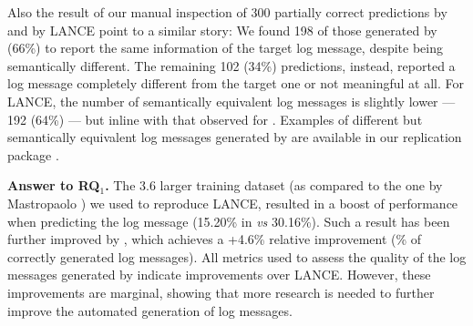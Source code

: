 Also the result of our manual inspection of 300 partially correct predictions by \approach and by LANCE point to a similar story: We found 198 of those generated by \approach (66\%) to report the same information of the target log message, despite being semantically different. The remaining 102 (34\%) predictions, instead, reported a log message completely different from the target one or not meaningful at all. For LANCE, the number of semantically equivalent log messages is slightly lower --- 192 (64\%) --- but inline with that observed for \approach. Examples of different but semantically equivalent log messages generated by \approach are available in our replication package \cite{replication}.


\vspace{0.2cm}
\begin{resultbox}
\textbf{Answer to RQ$_1$.} The 3.6 larger training dataset (as compared to the one by Mastropaolo \etal \cite{mastropaolo2022using}) we used to reproduce LANCE, resulted in a boost of performance when predicting the log message (15.20\% in \cite{mastropaolo2022using} \emph{vs} 30.16\%). Such a result has been further improved by \approach, which achieves a +4.6\% relative improvement (\% of correctly generated log messages). All metrics used to assess the quality of the log messages generated by \approach indicate improvements over LANCE. However, these improvements are marginal, showing that more research is needed to further improve the automated generation of log messages.
\end{resultbox}












